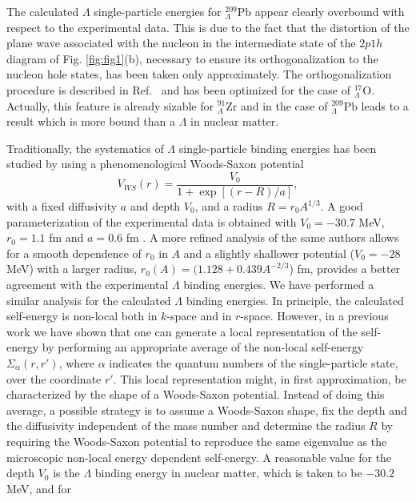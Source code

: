 The calculated $\Lambda$ single-particle energies for 
$_{\Lambda}^{209}$Pb appear clearly overbound with respect to the experimental data. 
This is due to the fact that the distortion of
the plane wave associated with the nucleon in the intermediate state of
the $2p1h$ diagram of Fig. \ref{fig:fig1}(b), necessary to ensure its
orthogonalization
to the nucleon hole states, has been taken only approximately. 
The orthogonalization procedure is described in Ref.\ \cite{bbmp92} and
has been optimized for 
the case of $_{\Lambda}^{17}$O. Actually, this
feature is already sizable for $_{\Lambda}^{91}$Zr and in the case of
 $_{\Lambda}^{209}$Pb
leads to a result which is more bound than a $\Lambda$ in nuclear matter.


Traditionally, the systematics of $\Lambda$ single-particle binding
energies
has been studied by using a phenomenological Woods-Saxon potential
\begin{equation}
      V_{WS}(r)=\frac{V_0}{1+\exp{[(r-R)/a]}},
      \label{eq:ws}
\end{equation}
with a fixed diffusivity $a$ and depth $V_0$,  and a radius $R=r_0
A^{1/3}$.
A good parameterization of the experimental data is obtained with
$V_0=-30.7$ MeV, $r_0=1.1$ fm and $a=0.6$ fm \cite{mille88}. 
 A more refined analysis of the same authors allows for a
smooth dependence of $r_0$ in $A$ and a slightly shallower
potential ($V_0=-28$ MeV) with a larger radius, $r_0(A)=(1.128 +
0.439 A^{-2/3}$) fm, provides a better agreement with the experimental $\Lambda$
binding energies. 
We have performed a similar analysis for  the calculated $\Lambda$
 binding energies. In principle, 
the calculated self-energy is non-local both in $k$-space and in
$r$-space.
However, in a previous work \cite{hjort96} we have shown that one can generate a
local representation of the self-energy by performing an appropriate
average of the non-local self-energy $\Sigma_{\alpha}(r,r')$, where
$\alpha$ indicates the quantum numbers of the single-particle state, over
the
coordinate $r'$. This local
representation might, in first approximation, be characterized by the
shape of a Woods-Saxon potential. Instead of doing this average, a possible 
strategy is to assume a Woods-Saxon shape, fix the depth and the
diffusivity independent of the mass number and determine the radius
$R$ by requiring the Woods-Saxon potential to reproduce the same
eigenvalue as the microscopic non-local energy dependent
self-energy. A reasonable value for the depth $V_0$ is the $\Lambda$
binding energy in nuclear matter, which is taken to be $-30.2$ MeV, and for
